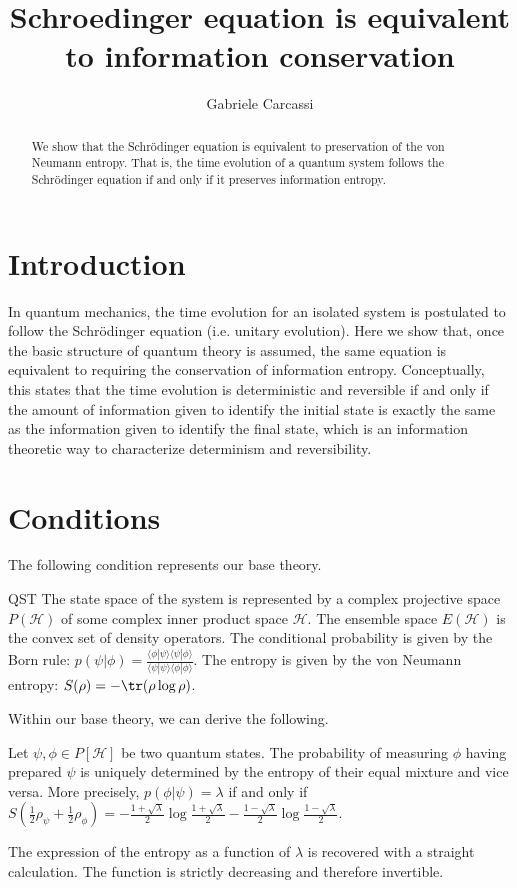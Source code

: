 \documentclass{techbrief}
\title{Schroedinger equation is equivalent to information conservation}
\author{Gabriele Carcassi}
\begin{document}
	\maketitle
	\begin{abstract}We show that the Schrödinger equation is equivalent to preservation of the von Neumann entropy. That is, the time evolution of a quantum system follows the Schrödinger equation if and only if it preserves information entropy.\end{abstract}
\section{Introduction}

In quantum mechanics, the time evolution for an isolated system is postulated to follow the Schrödinger equation (i.e. unitary evolution). Here we show that, once the basic structure of quantum theory is assumed, the same equation is equivalent to requiring the conservation of information entropy. Conceptually, this states that the time evolution is deterministic and reversible if and only if the amount of information given to identify the initial state is exactly the same as the information given to identify the final state, which is an information theoretic way to characterize determinism and reversibility.

\section{Conditions}

The following condition represents our base theory.
\begin{condition}{QST}
	The state space of the system is represented by a complex projective space $P(\mathcal{H})$ of some complex inner product space $\mathcal{H}$. The ensemble space $E(\mathcal{H})$ is the convex set of density operators. The conditional probability is given by the Born rule: $p(\psi|\phi) = \frac{\langle \phi | \psi \rangle\langle \psi | \phi \rangle}{\langle \psi | \psi \rangle\langle \phi | \phi \rangle}$. The entropy is given by the von Neumann entropy: $S(\rho) = -\tr(\rho \log \rho)$.
\end{condition}

Within our base theory, we can derive the following.
\begin{coro}\label{QM-ENT-PROB}
	Let $\psi, \phi \in P[\mathcal{H}]$ be two quantum states. The probability of measuring $\phi$ having prepared $\psi$ is uniquely determined by the entropy of their equal mixture and vice versa. More precisely, $p(\phi|\psi) = \lambda$ if and only if $S\left(\frac{1}{2} \rho_{\psi} + \frac{1}{2} \rho_{\phi} \right) =  - \frac{1+\sqrt{\lambda}}{2} \log \frac{1+\sqrt{\lambda}}{2} - \frac{1-\sqrt{\lambda}}{2} \log \frac{1-\sqrt{\lambda}}{2}.$
\end{coro}
The expression of the entropy as a function of $\lambda$ is recovered with a straight calculation. The function is strictly decreasing and therefore invertible.
\end{document}
